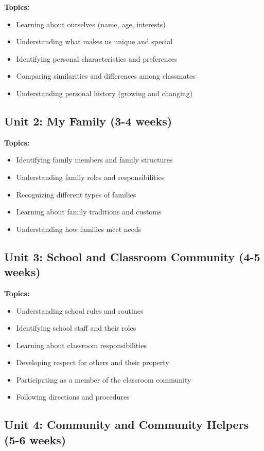 \documentclass[11pt,letterpaper]{report}
\begin{document}
\textbf{Topics:}
\begin{itemize}
    \item Learning about ourselves (name, age, interests)
    \item Understanding what makes us unique and special
    \item Identifying personal characteristics and preferences
    \item Comparing similarities and differences among classmates
    \item Understanding personal history (growing and changing)
\end{itemize}

\subsection{Unit 2: My Family (3-4 weeks)}

\textbf{Topics:}
\begin{itemize}
    \item Identifying family members and family structures
    \item Understanding family roles and responsibilities
    \item Recognizing different types of families
    \item Learning about family traditions and customs
    \item Understanding how families meet needs
\end{itemize}

\subsection{Unit 3: School and Classroom Community (4-5 weeks)}

\textbf{Topics:}
\begin{itemize}
    \item Understanding school rules and routines
    \item Identifying school staff and their roles
    \item Learning about classroom responsibilities
    \item Developing respect for others and their property
    \item Participating as a member of the classroom community
    \item Following directions and procedures
\end{itemize}

\subsection{Unit 4: Community and Community Helpers (5-6 weeks)}
\end{document}
